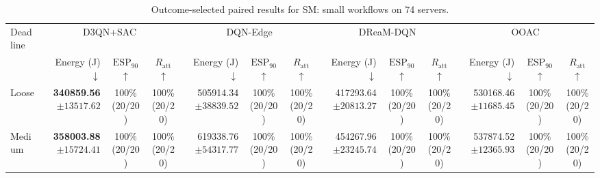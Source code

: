 \documentclass[10pt]{article}
\begin{document}
\begin{table}[!htbp]
\centering
\caption{Outcome-selected paired results for SM: small workflows on 74 servers.}
\label{tab:conditional_case_sm}
\begingroup
\footnotesize
\setlength{\tabcolsep}{2.2pt}
\renewcommand{\arraystretch}{1.08}
\begin{tabular}{@{}l*{4}{rcc}@{}}
\toprule
Deadline & \multicolumn{3}{c}{D3QN+SAC} & \multicolumn{3}{c}{DQN-Edge} & \multicolumn{3}{c}{DReaM-DQN} & \multicolumn{3}{c}{OOAC} \\
\cmidrule(lr){2-4}\cmidrule(lr){5-7}\cmidrule(lr){8-10}\cmidrule(lr){11-13}
 & Energy (J) $\downarrow$ & $\mathrm{ESP}_{90}$ $\uparrow$ & $R_{\mathrm{att}}$ $\uparrow$ & Energy (J) $\downarrow$ & $\mathrm{ESP}_{90}$ $\uparrow$ & $R_{\mathrm{att}}$ $\uparrow$ & Energy (J) $\downarrow$ & $\mathrm{ESP}_{90}$ $\uparrow$ & $R_{\mathrm{att}}$ $\uparrow$ & Energy (J) $\downarrow$ & $\mathrm{ESP}_{90}$ $\uparrow$ & $R_{\mathrm{att}}$ $\uparrow$ \\
\midrule
Loose & \shortstack[r]{\textbf{340859.56}\\$\pm 13517.62$} & \shortstack[c]{100\%\\(20/20)} & \shortstack[c]{100\%\\(20/20)} & \shortstack[r]{505914.34\\$\pm 38839.52$} & \shortstack[c]{100\%\\(20/20)} & \shortstack[c]{100\%\\(20/20)} & \shortstack[r]{417293.64\\$\pm 20813.27$} & \shortstack[c]{100\%\\(20/20)} & \shortstack[c]{100\%\\(20/20)} & \shortstack[r]{530168.46\\$\pm 11685.45$} & \shortstack[c]{100\%\\(20/20)} & \shortstack[c]{100\%\\(20/20)} \\
Medium & \shortstack[r]{\textbf{358003.88}\\$\pm 15724.41$} & \shortstack[c]{100\%\\(20/20)} & \shortstack[c]{100\%\\(20/20)} & \shortstack[r]{619338.76\\$\pm 54317.77$} & \shortstack[c]{100\%\\(20/20)} & \shortstack[c]{100\%\\(20/20)} & \shortstack[r]{454267.96\\$\pm 23245.74$} & \shortstack[c]{100\%\\(20/20)} & \shortstack[c]{100\%\\(20/20)} & \shortstack[r]{537874.52\\$\pm 12365.93$} & \shortstack[c]{100\%\\(20/20)} & \shortstack[c]{100\%\\(20/20)} \\

\end{tabular}
\end{table}
\end{document}
